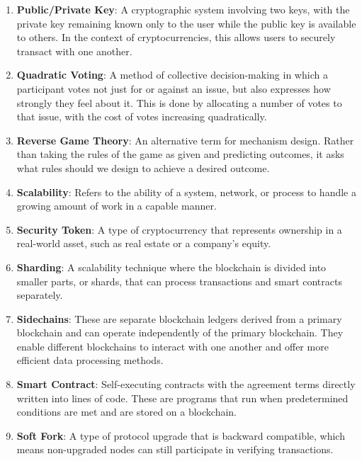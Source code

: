 \begin{enumerate}
    \item \textbf{Public/Private Key}: A cryptographic system involving two keys, with the private key remaining known only to the user while the public key is available to others. In the context of cryptocurrencies, this allows users to securely transact with one another.

    \item \textbf{Quadratic Voting}: A method of collective decision-making in which a participant votes not just for or against an issue, but also expresses how strongly they feel about it. This is done by allocating a number of votes to that issue, with the cost of votes increasing quadratically.

    \item \textbf{Reverse Game Theory}: An alternative term for mechanism design. Rather than taking the rules of the game as given and predicting outcomes, it asks what rules should we design to achieve a desired outcome.

    \item \textbf{Scalability}: Refers to the ability of a system, network, or process to handle a growing amount of work in a capable manner.

    \item \textbf{Security Token}: A type of cryptocurrency that represents ownership in a real-world asset, such as real estate or a company's equity.

    \item \textbf{Sharding}: A scalability technique where the blockchain is divided into smaller parts, or shards, that can process transactions and smart contracts separately.

    \item \textbf{Sidechains}: These are separate blockchain ledgers derived from a primary blockchain and can operate independently of the primary blockchain. They enable different blockchains to interact with one another and offer more efficient data processing methods.

    \item \textbf{Smart Contract}: Self-executing contracts with the agreement terms directly written into lines of code. These are programs that run when predetermined conditions are met and are stored on a blockchain.

    \item \textbf{Soft Fork}: A type of protocol upgrade that is backward compatible, which means non-upgraded nodes can still participate in verifying transactions.


\end{enumerate}
